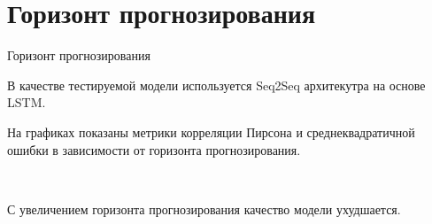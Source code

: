 \documentclass[10pt,pdf,hyperref={unicode}]{beamer}
\begin{document}
\section{Горизонт прогнозирования}
\begin{frame}{Горизонт прогнозирования}

В качестве тестируемой модели используется Seq2Seq архитекутра на основе LSTM.

На графиках показаны метрики корреляции Пирсона и среднеквадратичной ошибки в зависимости от горизонта прогнозирования.

\begin{figure}[h!t]\center
{}
\\
\end{figure}

С увеличением горизонта прогнозирования качество модели ухудшается.

\end{frame}

\end{document}
